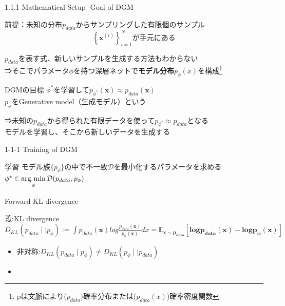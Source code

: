 \documentclass{beamer}
\newcommand{\argmin}{\mathop{\rm arg~min}\limits}
\begin{document}
\begin{frame}{1.1.1 Mathematical Setup -Goal of DGM}
\begin{exampleblock}{}
    前提：未知の分布$p_{data}$からサンプリングした有限個のサンプル\[
\left\{\mathbf{x}^{(i)}\right\}_{i=1}^{N}が手元にある
\]
\end{exampleblock}
\small $p_{data}$を表す式、新しいサンプルを生成する方法もわからない\\
⇒そこでパラメータ$\phi$を持つ深層ネットで\textbf{モデル分布}$p_{\phi}(x)$を構成\footnote{pは文脈により($p_{data}$)確率分布または($p_{data}(x)$)確率密度関数}
\begin{block}{DGMの目標}
    \centering$\phi^{*}$を学習して$p_{\phi^{*}}(\boldsymbol{x})\approx p_{data}(\boldsymbol{x})$\\
    $p_{\phi}$をGenerative model（生成モデル）という
\end{block}
⇒未知の$p_{data}$から得られた有限データを使って$p_{\phi^{*}}\approx p_{data}$となる\\
モデルを学習し、そこから新しいデータを生成する

\end{frame}
\begin{frame}{1-1-1 Training of DGM}
\begin{block}{学習}
モデル族$\{p_{\phi}\}$の中で不一致$\mathcal{D}$を最小化するパラメータを求める\\
\centering $\phi^{*}\in \argmin_{\phi}\mathcal{D}(p_{data},p_{\phi})$
\end{block}


\end{frame}
\begin{frame}{Forward KL divergence}
\begin{block}{義:KL divergence}
    $D_{KL}(p_{data}\mid\mid p_{\phi}):=\int p_{data}({\boldsymbol{x}})log\frac{p_{data}(\boldsymbol{x})}{p_{\phi}(\boldsymbol{x})}dx=\boldsymbol{\mathbb{E}_{\boldsymbol{x}\sim p_{data}}[logp_{data}(\boldsymbol{x})-logp_{\phi}(\boldsymbol{x})]}$
\end{block}

\begin{itemize}
    \item 非対称:$D_{KL}(p_{data}\mid p_{\phi} )\neq D_{KL}(p_{\phi}\mid\mid p_{data})$
    \item 
    
\end{itemize}
\end{frame}
\begin{frame}

\end{frame}
\end{document}
